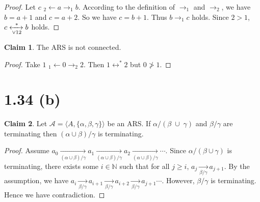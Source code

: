 \documentclass[autodetect-enginem]{article}
\theoremstyle{plain}
\theoremstyle{definition}
\newtheorem*{claim*}{Claim}
\begin{document}
\begin{proof}
    Let $c$ $_2\!\!\leftarrow a \to_1 b$.
    According to the definition of $\to_1$ and $\to_2$, we have $b = a+1$ and $c = a+2$.
    So we have $c = b+1$. Thus $b \to_1 c$ holds.
    Since $2 > 1$, $c \xleftrightarrow[\vee 12]{*} b$ holds.
\end{proof}

\begin{claim*}
    The ARS is not connected.
\end{claim*}
\begin{proof}
    Take $1$ $_1\!\!\leftarrow 0 \to_2 2$. Then $1 \leftrightarrow^* 2$ but $0 \ngtr 1$.
\end{proof}

\section*{1.34 (b)}

\begin{claim*}
    Let $\mathcal{A} = \langle A, \{\alpha, \beta, \gamma\} \rangle$ be an ARS.
    If $\alpha/(\beta\;\cup\;\gamma)$ and $\beta/\gamma$ are terminating
    then $(\alpha \cup \beta) / \gamma$ is terminating.
\end{claim*}

\newcommand{\abgto}{\xrightarrow[(\alpha \cup \beta)/\gamma]{}}
\begin{proof}
    Assume $a_0 \abgto a_1 \abgto a_2 \abgto \cdots$.
    Since $\alpha /(\beta \cup \gamma)$ is terminating, there exists some $i \in \mathbb{N}$
    such that for all $j \geq i$, $a_j \xrightarrow[\beta/\gamma]{} a_{j+1}$.
    By the assumption, we have $a_i \xrightarrow[\beta/\gamma]{} a_{i+1} \xrightarrow[\beta/\gamma]{} a_{i+2} \xrightarrow[\beta/\gamma]{} a_{j+1} \cdots$.
    However, $\beta/\gamma$ is terminating. Hence we have contradiction.
\end{proof}
\end{document}
